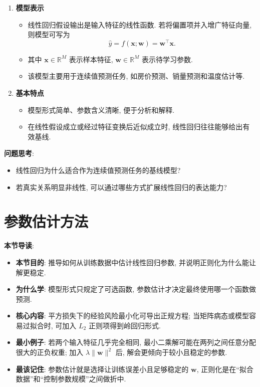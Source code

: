\documentclass{../nndlcourse}
\begin{document}
\begin{enumerate}
  \item \textbf{模型表示}
    \begin{itemize}
    \item 线性回归假设输出是输入特征的线性函数. 若将偏置项并入增广特征向量, 则模型可写为
    \begin{equation*}
    \hat{y} = f(\boldsymbol{x}; \boldsymbol{w}) = \boldsymbol{w}^{\top} \boldsymbol{x}.
    \end{equation*}
    \item 其中 $\boldsymbol{x} \in \mathbb{R}^M$ 表示样本特征, $\boldsymbol{w} \in \mathbb{R}^M$ 表示待学习参数.
    \item 该模型主要用于连续值预测任务, 如房价预测、销量预测和温度估计等.
    \end{itemize}
  \item \textbf{基本特点}
  \begin{itemize}
    \item 模型形式简单、参数含义清晰, 便于分析和解释.
    \item 在线性假设成立或经过特征变换后近似成立时, 线性回归往往能够给出有效基线.
  \end{itemize}
\end{enumerate}

\textbf{问题思考}:

\begin{itemize}
  \item 线性回归为什么适合作为连续值预测任务的基线模型?
  \item 若真实关系明显非线性, 可以通过哪些方式扩展线性回归的表达能力?
\end{itemize}

\section{参数估计方法}

\textbf{本节导读}:
\begin{itemize}
  \item \textbf{本节目的}: 推导如何从训练数据中估计线性回归参数, 并说明正则化为什么能让解更稳定.
  \item \textbf{为什么学}: 模型形式只规定了可选函数, 参数估计才决定最终使用哪一个函数做预测.
  \item \textbf{核心内容}: 平方损失下的经验风险最小化可导出正规方程; 当矩阵病态或模型容易过拟合时, 可加入 $L_2$ 正则项得到岭回归形式.
  \item \textbf{最小例子}: 若两个输入特征几乎完全相同, 最小二乘解可能在两列之间任意分配很大的正负权重; 加入 $\lambda\|\boldsymbol{w}\|^2$ 后, 解会更倾向于较小且稳定的参数.
  \item \textbf{最该记住}: 参数估计就是选择让训练误差小且足够稳定的 $\boldsymbol{w}$, 正则化是在“拟合数据”和“控制参数规模”之间做折中.
\end{itemize}
\end{document}
